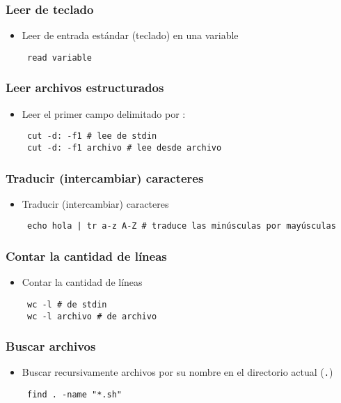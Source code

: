 \begin{frame}[fragile]
  \frametitle{Leer de teclado}
  \begin{itemize}
    \item Leer de entrada estándar (teclado) en una variable
   \begin{lstlisting}
 read variable
   \end{lstlisting}
  \end{itemize}
\end{frame}

\begin{frame}[fragile]
  \frametitle{Leer archivos estructurados}
  \begin{itemize}
    \item Leer el primer campo delimitado por :
   \begin{lstlisting}
 cut -d: -f1 # lee de stdin
 cut -d: -f1 archivo # lee desde archivo
   \end{lstlisting}
  \end{itemize}
\end{frame}

\begin{frame}[fragile]
  \frametitle{Traducir (intercambiar) caracteres}
  \begin{itemize}
    \item Traducir (intercambiar) caracteres
   \begin{lstlisting}
 echo hola | tr a-z A-Z # traduce las minúsculas por mayúsculas
   \end{lstlisting}
  \end{itemize}
\end{frame}

\begin{frame}[fragile]
  \frametitle{Contar la cantidad de líneas}
  \begin{itemize}
    \item Contar la cantidad de líneas
   \begin{lstlisting}
 wc -l # de stdin
 wc -l archivo # de archivo
   \end{lstlisting}
  \end{itemize}
\end{frame}

\begin{frame}[fragile]
  \frametitle{Buscar archivos}
  \begin{itemize}
    \item Buscar recursivamente archivos por su nombre en el directorio actual (\texttt{.})
   \begin{lstlisting}
 find . -name "*.sh"
   \end{lstlisting}
  \end{itemize}
\end{frame}

